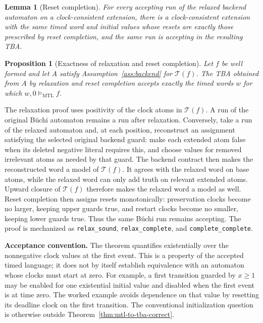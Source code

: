 \documentclass[10pt,journal,compsoc]{IEEEtran}
\newtheorem{lemma}[theorem]{Lemma}
\newtheorem{proposition}[theorem]{Proposition}
\newcommand{\satM}{\models_{\mathrm{MTL}}}
\newcommand{\T}{\mathcal{T}}
\newcommand{\runinhead}[1]{\par\smallskip\noindent\textbf{#1}\enspace}
\begin{document}
\begin{lemma}[Reset completion]
\label{lem:reset-completion}
For every accepting run of the relaxed backend automaton on a
clock-consistent extension, there is a clock-consistent extension with the
same timed word and initial values whose resets are exactly those prescribed
by reset completion, and the same run is accepting in the resulting TBA.
\end{lemma}

\begin{proposition}[Exactness of relaxation and reset completion]
\label{prop:reset-completion}
Let $f$ be well formed and let $A$ satisfy Assumption~\ref{ass:backend}
for $\T(f)$. The TBA obtained from $A$ by relaxation and reset completion
accepts exactly the timed words $w$ for which $w,0\satM f$.
\end{proposition}
The relaxation proof uses positivity of the clock atoms in $\T(f)$. A run
of the original B\"uchi automaton remains a run after relaxation. Conversely,
take a run of the relaxed automaton and, at each position, reconstruct an
assignment satisfying the selected original backend guard: make each extended
atom false when its deleted negative literal requires this, and choose values
for removed irrelevant atoms as needed by that guard. The backend contract
then makes the reconstructed word a model of $\T(f)$. It agrees with the
relaxed word on base atoms, while the relaxed word can only add truth on
relevant extended atoms. Upward closure of $\T(f)$ therefore makes the
relaxed word a model as well.
Reset completion then assigns resets monotonically: preservation clocks
become no larger, keeping upper guards true, and restart clocks become no
smaller, keeping lower guards true. Thus the same B\"uchi run remains
accepting. The proof is mechanized as
\texttt{relax\_sound}, \texttt{relax\_complete}, and
\texttt{complete\_complete}.

\runinhead{Acceptance convention.}
The theorem quantifies existentially over the nonnegative clock values at
the first event. This is a property of the accepted timed language; it does
not by itself establish equivalence with an automaton whose clocks must
start at zero. For example, a first transition guarded by $x\ge1$ may be
enabled for one existential initial value and disabled when the first event
is at time zero. The worked example avoids dependence on that value by
resetting its deadline clock on the first transition. The conventional
initialization question is otherwise outside Theorem~\ref{thm:mtl-to-tba-correct}.
\end{document}
